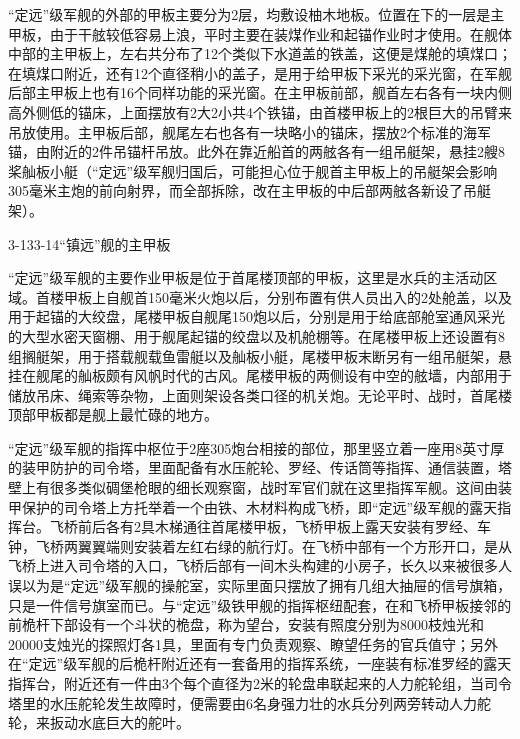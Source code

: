 \documentclass[12pt,UTF8]{ctexbook}
\begin{document}
“定远”级军舰的外部的甲板主要分为2层，均敷设柚木地板。位置在下的一层是主甲板，由于干舷较低容易上浪，平时主要在装煤作业和起锚作业时才使用。在舰体中部的主甲板上，左右共分布了12个类似下水道盖的铁盖，这便是煤舱的填煤口；在填煤口附近，还有12个直径稍小的盖子，是用于给甲板下采光的采光窗，在军舰后部主甲板上也有16个同样功能的采光窗。在主甲板前部，舰首左右各有一块内侧高外侧低的锚床，上面摆放有2大2小共4个铁锚，由首楼甲板上的2根巨大的吊臂来吊放使用。主甲板后部，舰尾左右也各有一块略小的锚床，摆放2个标准的海军锚，由附近的2件吊锚杆吊放。此外在靠近船首的两舷各有一组吊艇架，悬挂2艘8桨舢板小艇（“定远”级军舰归国后，可能担心位于舰首主甲板上的吊艇架会影响305毫米主炮的前向射界，而全部拆除，改在主甲板的中后部两舷各新设了吊艇架）。

3-133-14“镇远”舰的主甲板

“定远”级军舰的主要作业甲板是位于首尾楼顶部的甲板，这里是水兵的主活动区域。首楼甲板上自舰首150毫米火炮以后，分别布置有供人员出入的2处舱盖，以及用于起锚的大绞盘，尾楼甲板自舰尾150炮以后，分别是用于给底部舱室通风采光的大型水密天窗棚、用于舰尾起锚的绞盘以及机舱棚等。在尾楼甲板上还设置有8组搁艇架，用于搭载舰载鱼雷艇以及舢板小艇，尾楼甲板末断另有一组吊艇架，悬挂在舰尾的舢板颇有风帆时代的古风。尾楼甲板的两侧设有中空的舷墙，内部用于储放吊床、绳索等杂物，上面则架设各类口径的机关炮。无论平时、战时，首尾楼顶部甲板都是舰上最忙碌的地方。

“定远”级军舰的指挥中枢位于2座305炮台相接的部位，那里竖立着一座用8英寸厚的装甲防护的司令塔，里面配备有水压舵轮、罗经、传话筒等指挥、通信装置，塔壁上有很多类似碉堡枪眼的细长观察窗，战时军官们就在这里指挥军舰。这间由装甲保护的司令塔上方托举着一个由铁、木材料构成飞桥，即“定远”级军舰的露天指挥台。飞桥前后各有2具木梯通往首尾楼甲板，飞桥甲板上露天安装有罗经、车钟，飞桥两翼翼端则安装着左红右绿的航行灯。在飞桥中部有一个方形开口，是从飞桥上进入司令塔的入口，飞桥后部有一间木头构建的小房子，长久以来被很多人误以为是“定远”级军舰的操舵室，实际里面只摆放了拥有几组大抽屉的信号旗箱，只是一件信号旗室而已。与“定远”级铁甲舰的指挥枢纽配套，在和飞桥甲板接邻的前桅杆下部设有一个斗状的桅盘，称为望台，安装有照度分别为8000枝烛光和20000支烛光的探照灯各1具，里面有专门负责观察、瞭望任务的官兵值守；另外在“定远”级军舰的后桅杆附近还有一套备用的指挥系统，一座装有标准罗经的露天指挥台，附近还有一件由3个每个直径为2米的轮盘串联起来的人力舵轮组，当司令塔里的水压舵轮发生故障时，便需要由6名身强力壮的水兵分列两旁转动人力舵轮，来扳动水底巨大的舵叶。
\end{document}
